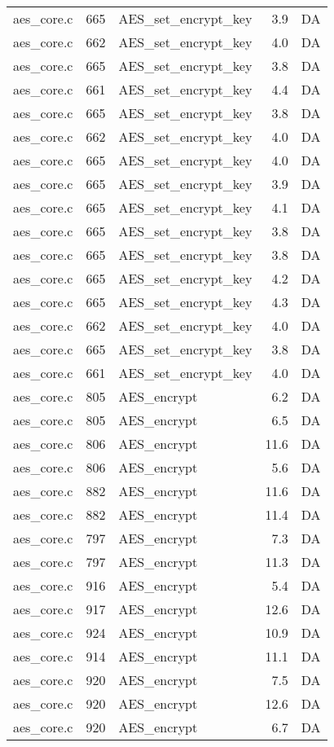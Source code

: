 \begin{table}[!ht]
\begin{tabular}{lrlrr}
aes\_core.c& 665&AES\_set\_encrypt\_key&3.9 &DA\\
aes\_core.c& 662&AES\_set\_encrypt\_key&4.0 &DA\\
aes\_core.c& 665&AES\_set\_encrypt\_key&3.8 &DA\\
aes\_core.c& 661&AES\_set\_encrypt\_key&4.4 &DA\\
aes\_core.c& 665&AES\_set\_encrypt\_key&3.8 &DA\\
aes\_core.c& 662&AES\_set\_encrypt\_key&4.0 &DA\\
aes\_core.c& 665&AES\_set\_encrypt\_key&4.0 &DA\\
aes\_core.c& 665&AES\_set\_encrypt\_key&3.9 &DA\\
aes\_core.c& 665&AES\_set\_encrypt\_key&4.1 &DA\\
aes\_core.c& 665&AES\_set\_encrypt\_key&3.8 &DA\\
aes\_core.c& 665&AES\_set\_encrypt\_key&3.8 &DA\\
aes\_core.c& 665&AES\_set\_encrypt\_key&4.2 &DA\\
aes\_core.c& 665&AES\_set\_encrypt\_key&4.3 &DA\\
aes\_core.c& 662&AES\_set\_encrypt\_key&4.0 &DA\\
aes\_core.c& 665&AES\_set\_encrypt\_key&3.8 &DA\\
aes\_core.c& 661&AES\_set\_encrypt\_key&4.0 &DA\\
aes\_core.c& 805&AES\_encrypt&6.2 &DA\\
aes\_core.c& 805&AES\_encrypt&6.5 &DA\\
aes\_core.c& 806&AES\_encrypt&11.6 &DA\\
aes\_core.c& 806&AES\_encrypt&5.6 &DA\\
aes\_core.c& 882&AES\_encrypt&11.6 &DA\\
aes\_core.c& 882&AES\_encrypt&11.4 &DA\\
aes\_core.c& 797&AES\_encrypt&7.3 &DA\\
aes\_core.c& 797&AES\_encrypt&11.3 &DA\\
aes\_core.c& 916&AES\_encrypt&5.4 &DA\\
aes\_core.c& 917&AES\_encrypt&12.6 &DA\\
aes\_core.c& 924&AES\_encrypt&10.9 &DA\\
aes\_core.c& 914&AES\_encrypt&11.1 &DA\\
aes\_core.c& 920&AES\_encrypt&7.5 &DA\\
aes\_core.c& 920&AES\_encrypt&12.6 &DA\\
aes\_core.c& 920&AES\_encrypt&6.7 &DA\\

\end{tabular}
\end{table}
